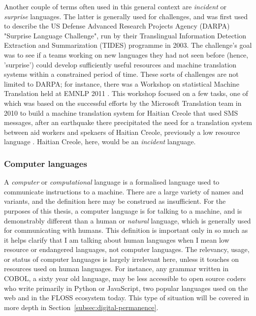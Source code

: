Another couple of terms often used in this general context are \textit{incident} or \textit{surprise} languages. The latter is generally used for challenges, and was first used to describe the US Defense Advanced Research Projects Agency (DARPA) "Surprise Language Challenge", run by their Translingual Information Detection Extraction and Summarization (TIDES) programme in 2003. The challenge's goal was to see if a teams working on new languages they had not seen before (hence, 'surprise') could develop sufficiently useful resources and machine translation systems within a constrained period of time. \citep{oard2003surprise} These sorts of challenges are not limited to DARPA; for instance, there was a Workshop on statistical Machine Translation held at EMNLP 2011 \citep{callison2011findings}. This workshop focused on a few tasks, one of which was based on the successful efforts by the Microsoft Translation team in 2010 to build a machine translation system for Haitian Creole that used SMS messages, after an earthquake there precipitated the need for a translation system between aid workers and spekaers of Haitian Creole, previously a low resource language \citep{lewis2010haitian, lewis2011crisis}. Haitian Creole, here, would be an \textit{incident} language.

\subsubsection{Computer languages}

A \textit{computer} or \textit{computational} language is a formalised language used to communicate instructions to a machine. There are a large variety of names and variants, and the definition here may be construed as insufficient. For the purposes of this thesis, a computer language is for talking to a machine, and is demonstrably different than a human or \textit{natural} language, which is generally used for communicating with humans. This definition is important only in so much as it helps clarify that I am talking about human languages when I mean low resource or endangered languages, not computer languages. The relevancy, usage, or status of computer languages is largely irrelevant here, unless it touches on resources used on human languages. For instance, any grammar written in COBOL, a sixty year old language, may be less accessible to open source coders who write primarily in Python or JavaScript, two popular languages used on the web and in the FLOSS ecosystem today. This type of situation will be covered in more depth in Section~\ref{subsec:digital-permanence}.


